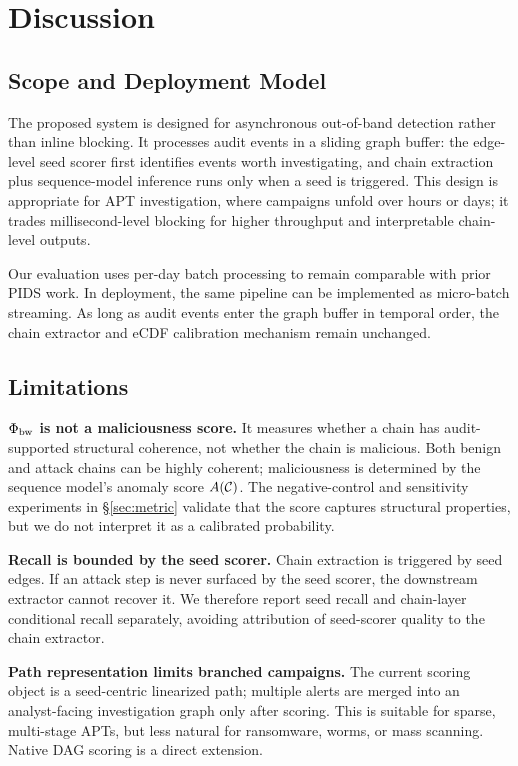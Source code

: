 \section{Discussion}
\label{sec:discussion}

\subsection{Scope and Deployment Model}

The proposed system is designed for asynchronous out-of-band detection rather than inline blocking. It processes audit events in a sliding graph buffer: the edge-level seed scorer first identifies events worth investigating, and chain extraction plus sequence-model inference runs only when a seed is triggered. This design is appropriate for APT investigation, where campaigns unfold over hours or days; it trades millisecond-level blocking for higher throughput and interpretable chain-level outputs.

Our evaluation uses per-day batch processing to remain comparable with prior PIDS work. In deployment, the same pipeline can be implemented as micro-batch streaming. As long as audit events enter the graph buffer in temporal order, the chain extractor and eCDF calibration mechanism remain unchanged.

\subsection{Limitations}

\textbf{$\Phi_{\text{bw}}$ is not a maliciousness score.} It measures whether a chain has audit-supported structural coherence, not whether the chain is malicious. Both benign and attack chains can be highly coherent; maliciousness is determined by the sequence model's anomaly score $A(\mathcal{C})$. The negative-control and sensitivity experiments in \S\ref{sec:metric} validate that the score captures structural properties, but we do not interpret it as a calibrated probability.

\textbf{Recall is bounded by the seed scorer.} Chain extraction is triggered by seed edges. If an attack step is never surfaced by the seed scorer, the downstream extractor cannot recover it. We therefore report seed recall and chain-layer conditional recall separately, avoiding attribution of seed-scorer quality to the chain extractor.

\textbf{Path representation limits branched campaigns.} The current scoring object is a seed-centric linearized path; multiple alerts are merged into an analyst-facing investigation graph only after scoring. This is suitable for sparse, multi-stage APTs, but less natural for ransomware, worms, or mass scanning. Native DAG scoring is a direct extension.

